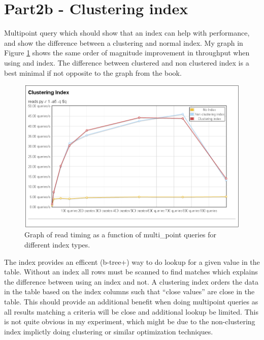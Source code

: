 \section{Part2b - Clustering index}
Multipoint query which should show that an index can help with performance, and
show the difference between a clustering and normal index. My graph in Figure
\ref{fig:clust} shows the same order of magnitude improvement in throughput when
using and index. The difference between clustered and non clustered index is a
best minimal if not opposite to the graph from the book.
\begin{figure}
  \centering
  \includegraphics[width=12cm]{assignment2/clust}
  \caption[Read performance - Clustering Index]{Graph of read timing as a
  function of multi\_point queries for different index types. }\label{fig:clust}
\end{figure}

The index provides an efficent (b-tree+) way to do lookup for a given value in
the table. Without an index all rows must be scanned to find matches which
explains the difference between using an index and not. A clustering index
orders the data in the table based on the index columns such that ``close
values'' are close in the table. This should provide an additional benefit when
doing multipoint queries as all results matching a criteria will be close and
additional lookup be limited. This is not quite obvious in my experiment, which
might be due to the non-clustering index implictly doing clustering or similar
optimization techniques.

